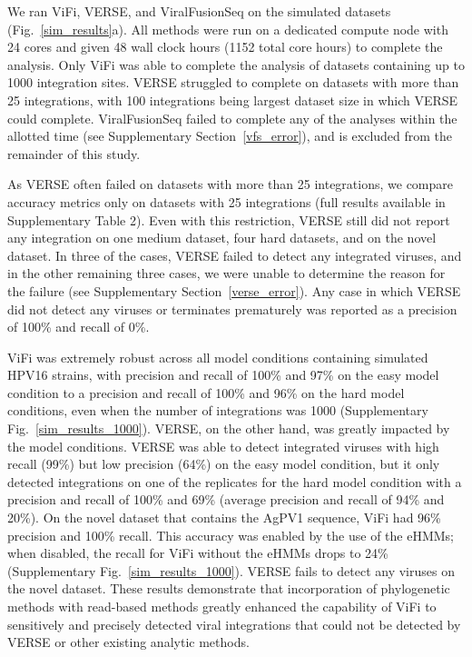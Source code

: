 \documentclass{bmcart}
\begin{document}
We ran ViFi, VERSE, and ViralFusionSeq on the simulated datasets
(Fig.~\ref{sim_results}a).  All methods were run on a dedicated
compute node with 24 cores and given 48 wall clock hours (1152 total core hours) to complete the analysis.  Only ViFi
was able to complete the analysis of datasets containing up to 1000
integration sites.  VERSE struggled to complete on datasets with more than
25 integrations, with 100 integrations being largest dataset size
in which VERSE could complete.  ViralFusionSeq failed to complete any of
the analyses within the allotted time (see
Supplementary Section~\ref{vfs_error}), and is excluded from the remainder of
this study.

As VERSE often failed on datasets with more than 25 integrations, we
compare accuracy metrics only on datasets with 25 integrations (full results available
in Supplementary Table 2).  Even
with this restriction, VERSE still did not report any integration on
one medium dataset, four hard datasets, and on the novel dataset.  In
three of the cases, VERSE failed to detect any integrated viruses, and
in the other remaining three cases, we were unable to determine the
reason for the failure (see Supplementary Section~\ref{verse_error}).  Any case
in which VERSE did not detect any viruses or terminates prematurely
was reported as a precision of 100\% and recall of 0\%.

ViFi was extremely robust across all model conditions containing
simulated HPV16 strains, with precision and recall of 100\% and 97\% on the
easy model condition to a precision and recall of 100\% and 96\% on
the hard model conditions, even when the number of integrations
was 1000 (Supplementary Fig.~\ref{sim_results_1000}). VERSE, on the other hand, was greatly
impacted by the model conditions.  VERSE was able to detect integrated
viruses with high recall (99\%) but low precision (64\%) on the easy
model condition, but it only detected integrations on one of the
replicates for the hard model condition with a precision and recall of
100\% and 69\% (average precision and recall of 94\% and 20\%).  On
the novel dataset that contains the AgPV1 sequence, ViFi had 96\%
precision and 100\% recall.  This accuracy was enabled by the use of
the eHMMs; when disabled, the recall for ViFi without the
eHMMs drops to 24\% (Supplementary Fig.~\ref{sim_results_1000}).  VERSE fails to
detect any viruses on the novel dataset.  These results demonstrate
that incorporation of phylogenetic methods with read-based methods
greatly enhanced the capability of ViFi to sensitively and precisely
detected viral integrations that could not be detected by VERSE or
other existing analytic methods.
\end{document}
